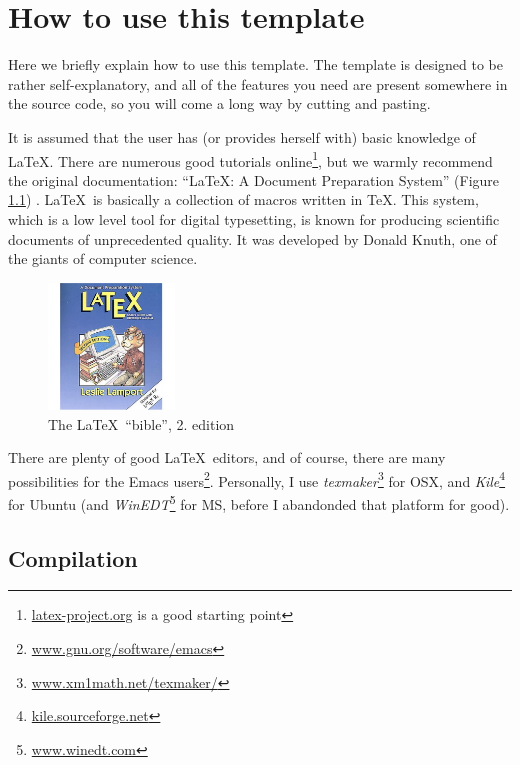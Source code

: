 \cleardoublepage
\chapter{How to use this template}
\label{chap:how-to} 

Here we briefly explain how to use this template. The template is designed to be rather self-explanatory, and all of the features you need are present somewhere in the source code, so you will come a long way by cutting and pasting.

It is assumed that the user has (or provides herself with) basic knowledge of  \LaTeX. There are numerous good tutorials online\footnote{\url{latex-project.org} is a good starting point}, but we warmly recommend the original documentation:  ``\LaTeX: A Document Preparation System'' (Figure \ref{fig:lamport}) \cite{lamport94ldp}.  \LaTeX\ is basically a collection of macros written in \TeX.
This system, which is a low level tool for digital typesetting, is known for producing scientific documents of unprecedented quality. It was developed by Donald Knuth,
one of the giants of computer science.

\begin{figure}[h]
\centering 
    \includegraphics[width=0.3\textwidth]{lamport}
    \caption{The  \LaTeX\ ``bible'', 2. edition \label{fig:lamport}}
\end{figure}

There are plenty of good  \LaTeX\ editors, and of course, there are many possibilities for the Emacs users\footnote{\url{www.gnu.org/software/emacs}}. Personally, I use {\em texmaker}\footnote{\url{www.xm1math.net/texmaker/}}
for OSX, and 
{\em Kile}\footnote{\url{kile.sourceforge.net}}
for Ubuntu (and {\em WinEDT}\footnote{\url{www.winedt.com}}
for MS, before I abandonded that platform for good). 


\section{Compilation}

